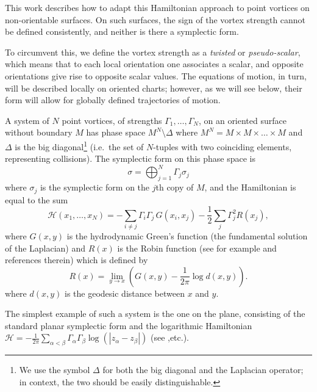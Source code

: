 \documentclass[11pt,twoside]{article}
\theoremstyle{definition}
\numberwithin{equation}{section}
\begin{document}
This work describes how to adapt this Hamiltonian approach to point vortices on non-orientable surfaces. On such surfaces, the sign of the vortex strength cannot be defined consistently, and neither is there a symplectic form.

To circumvent this, we define the vortex strength as a  \emph{twisted} or \emph{pseudo-scalar}, which means that to each local orientation one associates a scalar, and opposite orientations give rise to opposite scalar values. The equations of motion, in turn, will be described locally on oriented charts; however, as we will see below, their form will allow for globally defined trajectories of motion.   


A system of $N$ point vortices, of strengths $\Gamma_1,\dots,\Gamma_N$,  on an oriented surface without boundary $M$ has phase space $M^N\setminus\Delta$ where $M^N = M\times M\times\dots\times M$ and $\Delta$ is the big diagonal\footnote{We use the symbol $\Delta$ for both the big diagonal and the Laplacian operator; in context, the two should be easily distinguishable.} (i.e.\ the set of $N$-tuples with two coinciding elements, representing collisions). The symplectic form on this phase space is
\begin{equation}
\label{eq:omega usual}\sigma = \bigoplus_{j=1}^N\Gamma_j\sigma_j\end{equation}
where $\sigma_j$ is the symplectic form on the $j$th copy of $M$, and the Hamiltonian is equal to the sum 
\begin{equation}
\label{eq:vortex Hamiltonian}
\mathcal{H}(x_1,\dots,x_N) = -\sum_{i\neq j} \Gamma_i\Gamma_j\,G(x_i,x_j) -
\frac12\sum_j\Gamma_j^2R(x_j),
\end{equation}
where $G(x,y)$ is the hydrodynamic Green's function (the fundamental solution of the Laplacian) and $R(x)$ is the Robin function (see for example \cite{dritschel2015motion,boatto-koiller-surfaces} and references therein) which is defined by
\begin{equation}
\label{eq: Robin function definition}
R(x) = \lim_{y\to x} \left(G(x,y) -\frac1{2\pi}\log d(x,y)\right).
\end{equation}
where $d(x,y)$ is the geodesic distance between $x$ and $y$.


The simplest example of such a system is the one on the plane,  consisting of the standard planar symplectic form and the logarithmic Hamiltonian $\mathcal{H} = -\frac{1}{2\pi}\sum_{\alpha<\beta}\Gamma_{\alpha}\Gamma_{\beta}  \log(|z_{\alpha} - z_{\beta}|)$ (see \cite{aref2007point,newton2001, kirchhof1883vorlesungen},etc.).  
\end{document}
